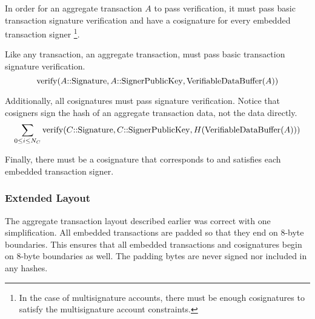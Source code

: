In order for an aggregate transaction $A$ to pass verification, it must pass basic transaction signature verification and have a cosignature for every embedded transaction signer
\footnote{In the case of multisignature accounts, there must be enough cosignatures to satisfy the multisignature account constraints.}.

Like any transaction, an aggregate transaction, must pass basic transaction signature verification.
$$\mathrm{verify}(A\mathrm{{::}Signature}, A\mathrm{{::}SignerPublicKey}, \mathrm{VerifiableDataBuffer}(A))$$

Additionally, all cosignatures must pass signature verification.
Notice that cosigners sign the hash of an aggregate transaction data, not the data directly.
$$\sum_{0\leq i \leq N_C} \mathrm{verify}(C\mathrm{{::}Signature}, C\mathrm{{::}SignerPublicKey}, H(\mathrm{VerifiableDataBuffer}(A)))$$

Finally, there must be a cosignature that corresponds to and satisfies each embedded transaction signer.

\subsubsection{Extended Layout}

The aggregate transaction layout described earlier was correct with one simplification.
All embedded transactions are padded so that they end on 8-byte boundaries.
This ensures that all embedded transactions and cosignatures begin on 8-byte boundaries as well.
The padding bytes are never signed nor included in any hashes.

\begin{figure}[H]
\end{figure}


